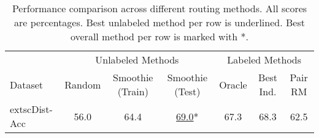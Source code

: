\begin{table}[t]
\centering
\begin{tabular}{l|ccc|ccc}
\toprule
& \multicolumn{3}{c|}{Unlabeled Methods} & \multicolumn{3}{c}{Labeled Methods} \\
Dataset & Random & Smoothie (Train) & Smoothie (Test) & Oracle & Best Ind. & Pair RM \\\midrule
	extsc{Dist-Acc} & 56.0 & 64.4 & \underline{69.0}* & 67.3 & 68.3 & 62.5 \\
\bottomrule
\end{tabular}
\caption{Performance comparison across different routing methods. All scores are percentages. Best unlabeled method per row is underlined. Best overall method per row is marked with *.}
\label{tab:routing_results}
\end{table}